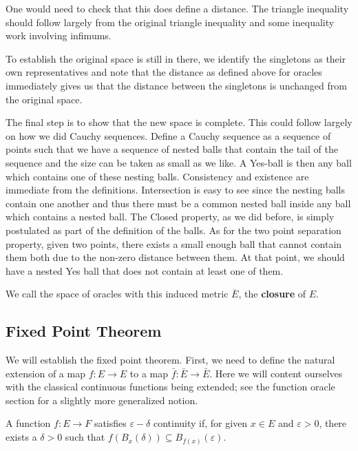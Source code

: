 \documentclass[12pt]{article}
\begin{document}
One would need to check that this does define a distance. The triangle inequality should follow largely from the original triangle inequality and some inequality work involving infimums. 

To establish the original space is still in there, we identify the singletons as their own representatives and note that the distance as defined above for oracles immediately gives us that the distance between the singletons is unchanged from the original space. 

The final step is to show that the new space is complete. This could follow largely on how we did Cauchy sequences. Define a Cauchy sequence as a sequence of points such that we have a sequence of nested balls that contain the tail of the sequence and the size can be taken as small as we like. A Yes-ball is then any ball which contains one of these nesting balls. Consistency and existence are immediate from the definitions. Intersection is easy to see since the nesting balls contain one another and thus there must be a common nested ball inside any ball which contains a nested ball. The Closed property, as we did before, is simply postulated as part of the definition of the balls. As for the two point separation property, given two points, there exists a small enough ball that cannot contain them both due to the non-zero distance between them. At that point, we should have a nested Yes ball that does not contain at least one of them. 

We call the space of oracles with this induced metric $\overline{E}$, the \textbf{closure} of $E$.


\subsection{Fixed Point Theorem}

We will establish the fixed point theorem. First, we need to define the natural extension of a map $f: E \to E$ to a map $\bar{f} : \bar{E} \to \bar{E}$. Here we will content ourselves with the classical continuous functions being extended; see the function oracle section for a slightly more generalized notion. 

\begin{definition}
    A function $f: E \to F$ satisfies $\varepsilon-\delta$ continuity if, for given $x \in E$ and $\varepsilon > 0$, there exists a $\delta > 0$ such that $f(B_{x} (\delta)) \subseteq B_{f(x)} (\varepsilon)$.
\end{definition}
\end{document}
